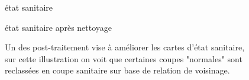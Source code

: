 \documentclass[a4paper, 12pt]{article} %
\begin{document}
\begin{figure}
\begin{minipage}[b]{.49\linewidth}
	\centering état sanitaire
\end{minipage}%
\begin{minipage}[b]{.49\linewidth}
	\centering état sanitaire après nettoyage
\end{minipage}
	\label{fig:clean}
	\caption{Un des post-traitement vise à améliorer les cartes d'état sanitaire, sur cette illustration on voit que certaines coupes "normales" sont reclassées en coupe sanitaire sur base de relation de voisinage.}
\end{figure}
\end{document}
